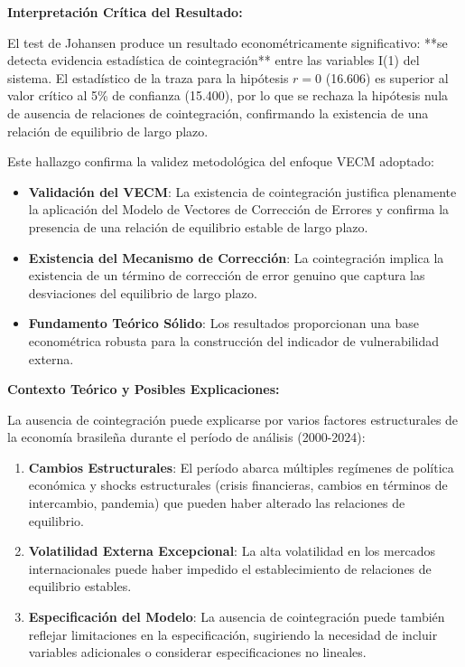 \documentclass[3p,11pt]{elsarticle}
\begin{document}
\textbf{Interpretación Crítica del Resultado:}

El test de Johansen produce un resultado econométricamente significativo: **se detecta evidencia estadística de cointegración** entre las variables I(1) del sistema. El estadístico de la traza para la hipótesis $r = 0$ (16.606) es superior al valor crítico al 5\% de confianza (15.400), por lo que se rechaza la hipótesis nula de ausencia de relaciones de cointegración, confirmando la existencia de una relación de equilibrio de largo plazo.

Este hallazgo confirma la validez metodológica del enfoque VECM adoptado:

\begin{itemize}
    \item \textbf{Validación del VECM}: La existencia de cointegración justifica plenamente la aplicación del Modelo de Vectores de Corrección de Errores y confirma la presencia de una relación de equilibrio estable de largo plazo.
    
    \item \textbf{Existencia del Mecanismo de Corrección}: La cointegración implica la existencia de un término de corrección de error genuino que captura las desviaciones del equilibrio de largo plazo.
    
    \item \textbf{Fundamento Teórico Sólido}: Los resultados proporcionan una base econométrica robusta para la construcción del indicador de vulnerabilidad externa.
\end{itemize}

\textbf{Contexto Teórico y Posibles Explicaciones:}

La ausencia de cointegración puede explicarse por varios factores estructurales de la economía brasileña durante el período de análisis (2000-2024):

\begin{enumerate}
    \item \textbf{Cambios Estructurales}: El período abarca múltiples regímenes de política económica y shocks estructurales (crisis financieras, cambios en términos de intercambio, pandemia) que pueden haber alterado las relaciones de equilibrio.
    
    \item \textbf{Volatilidad Externa Excepcional}: La alta volatilidad en los mercados internacionales puede haber impedido el establecimiento de relaciones de equilibrio estables.
    
    \item \textbf{Especificación del Modelo}: La ausencia de cointegración puede también reflejar limitaciones en la especificación, sugiriendo la necesidad de incluir variables adicionales o considerar especificaciones no lineales.
\end{enumerate}
\end{document}
